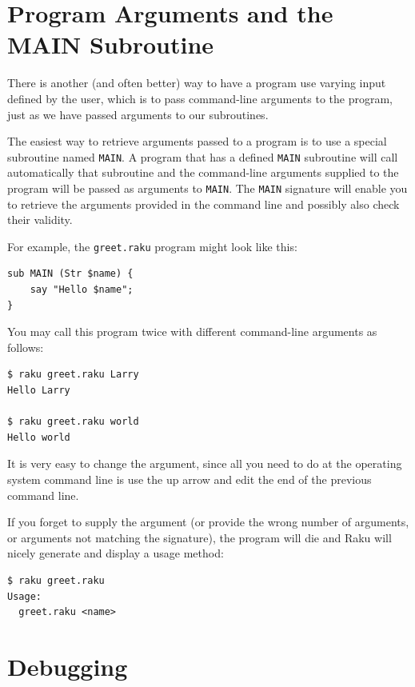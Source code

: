 \section{Program Arguments and the MAIN Subroutine}
\label{MAIN}

There is another (and often better) way to have a program 
use varying input defined by the user, which is to pass 
command-line arguments to the program, just as we have 
passed arguments to our subroutines.

The easiest way to retrieve arguments passed to a program is 
to use a special subroutine named \verb'MAIN'. A program that 
has a defined \verb'MAIN' subroutine will call automatically  
that subroutine and the command-line arguments supplied 
to the program will be passed as arguments to \verb'MAIN'. 
The \verb'MAIN' signature will enable you to 
retrieve the arguments provided in the command line and 
possibly also check their validity.

For example, the {\tt greet.raku} program might look like 
this:
\begin{verbatim}
sub MAIN (Str $name) {
    say "Hello $name";
}
\end{verbatim}

You may call this program twice with different command-line 
arguments as follows:

\begin{verbatim}
$ raku greet.raku Larry
Hello Larry

$ raku greet.raku world
Hello world
\end{verbatim}

It is very easy to change the argument, since all you need 
to do at the operating system command line is use the up arrow 
and edit the end of the previous command line.

If you forget to supply the argument (or provide the wrong 
number of arguments, or arguments not matching the signature), 
the program will die and Raku will nicely generate and 
display a usage method:

\begin{verbatim}
$ raku greet.raku
Usage:
  greet.raku <name>
\end{verbatim}


\section{Debugging}
\label{whitespace}

